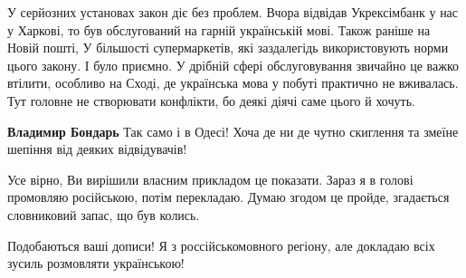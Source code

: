 \begin{itemize}
У серйозних установах закон діє без проблем. Вчора відвідав Укрексімбанк у нас
у Харкові, то був обслугований на гарній українській мові. Також раніше на
Новій пошті, У більшості супермаркетів, які заздалегідь використовують норми
цього закону. І було приємно. У дрібній сфері обслуговування звичайно це важко
втілити, особливо на Сході, де українська мова у побуті практично не вживалась.
Тут головне не створювати конфлікти, бо деякі діячі саме цього й хочуть.

\begin{itemize}
 
\textbf{Владимир Бондарь} Так само і в Одесі! Хоча де ни де чутно скиглення та змеїне шепіння від деяких відвідувачів!
\end{itemize}

 



 

Усе вірно, Ви вирішили власним прикладом це показати. Зараз я в голові
промовляю російською, потім перекладаю. Думаю згодом це пройде, згадається
словниковий запас, що був колись.


 
Подобаються ваші дописи! Я з россійськомовного регіону, але докладаю всіх зусиль розмовляти українською!

 

\end{itemize}
